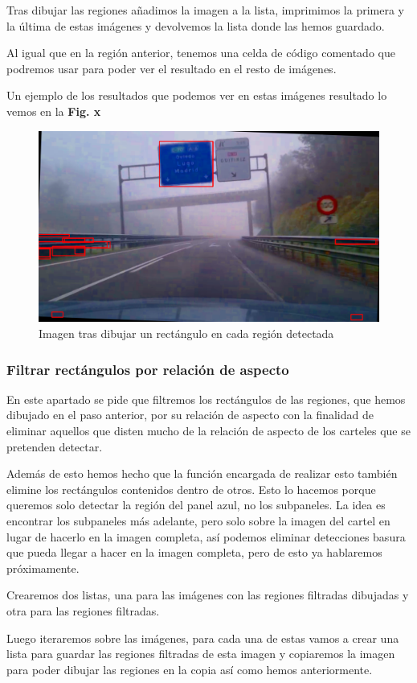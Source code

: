 \documentclass[a4paper, 12pt]{article}
\begin{document}
Tras dibujar las regiones añadimos la imagen a la lista, imprimimos la primera y la última de estas imágenes y devolvemos la lista donde las hemos guardado. 


Al igual que en la región anterior, tenemos una celda de código comentado que podremos usar para poder ver el resultado en el resto de imágenes.

Un ejemplo de los resultados que podemos ver en estas imágenes resultado lo vemos en la \textbf{Fig. x}
\begin{figure}[h]
	\centering
	\includegraphics[width=0.6\linewidth]{img/Rectangulos}
	\caption{Imagen tras dibujar un rectángulo en cada región detectada}
	\label{fig:Rectangulos}
\end{figure}

\subsubsection{Filtrar rectángulos por relación de aspecto}
En este apartado se pide que filtremos los rectángulos de las regiones, que hemos dibujado en el paso anterior, por su relación de aspecto con la finalidad de eliminar aquellos que disten mucho de la relación de aspecto de los carteles que se pretenden detectar. 


Además de esto hemos hecho que la función encargada de realizar esto también elimine los rectángulos contenidos dentro de otros. Esto lo hacemos porque queremos solo detectar la región del panel azul, no los subpaneles. La idea es encontrar los subpaneles más adelante, pero solo sobre la imagen del cartel en lugar de hacerlo en la imagen completa, así podemos eliminar detecciones basura que pueda llegar a hacer en la imagen completa, pero de esto ya hablaremos próximamente.


Crearemos dos listas, una para las imágenes con las regiones filtradas dibujadas y otra para las regiones filtradas. 


Luego iteraremos sobre las imágenes, para cada una de estas vamos a crear una lista para guardar las regiones filtradas de esta imagen y copiaremos la imagen para poder dibujar las regiones en la copia así como hemos anteriormente. 
\end{document}
